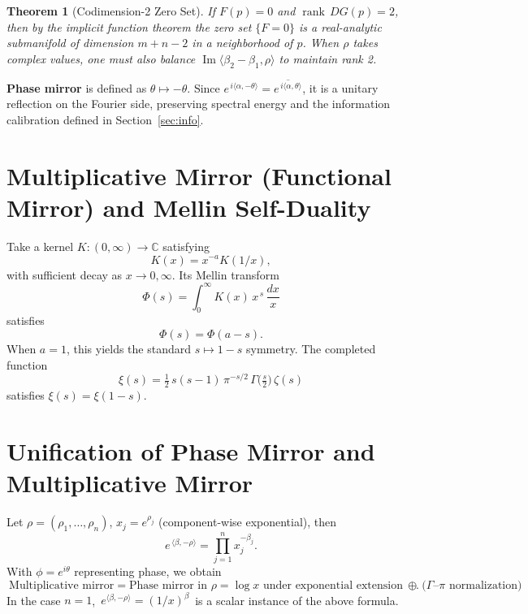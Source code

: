 \documentclass[11pt,a4paper]{article}
\newtheorem{theorem}{Theorem}[section]
\theoremstyle{remark}
\DeclareMathOperator{\Im}{Im}
\DeclareMathOperator{\rank}{rank}
\begin{document}
\begin{theorem}[Codimension-2 Zero Set]\label{thm:codim2}
If $F(p)=0$ and $\rank\,DG(p)=2$, then by the implicit function theorem the zero set $\{F=0\}$ is a real-analytic submanifold of dimension $m+n-2$ in a neighborhood of $p$. When $\rho$ takes complex values, one must also balance $\Im\langle\beta_2-\beta_1,\rho\rangle$ to maintain rank 2.
\end{theorem}

\textbf{Phase mirror} is defined as $\theta\mapsto-\theta$. Since $e^{\,i\langle\alpha,-\theta\rangle}=\overline{e^{\,i\langle\alpha,\theta\rangle}}$, it is a unitary reflection on the Fourier side, preserving spectral energy and the information calibration defined in Section~\ref{sec:info}.

\section{Multiplicative Mirror (Functional Mirror) and Mellin Self-Duality}

Take a kernel $K:(0,\infty)\to\mathbb{C}$ satisfying
\begin{equation}
K(x)=x^{-a}K(1/x),
\end{equation}
with sufficient decay as $x\to0,\infty$. Its Mellin transform
\begin{equation}
\Phi(s)=\int_0^\infty K(x)\,x^{\,s}\,\frac{dx}{x}
\end{equation}
satisfies
\begin{equation}
\Phi(s)=\Phi(a-s).
\end{equation}
When $a=1$, this yields the standard $s\mapsto1-s$ symmetry. The completed function
\begin{equation}
\xi(s)=\tfrac12\,s(s-1)\,\pi^{-s/2}\,\Gamma\bigl(\tfrac s2\bigr)\,\zeta(s)
\end{equation}
satisfies $\xi(s)=\xi(1-s)$.

\section{Unification of Phase Mirror and Multiplicative Mirror}

Let $\rho=(\rho_1,\dots,\rho_n)$, $x_j=e^{\rho_j}$ (component-wise exponential), then
\begin{equation}
e^{\,\langle\beta,-\rho\rangle}=\prod_{j=1}^{n}x_j^{-\beta_j}.
\end{equation}
With $\phi=e^{i\theta}$ representing phase, we obtain
\begin{equation}
\boxed{\ \text{Multiplicative mirror}=\text{Phase mirror in }\rho=\log x\text{ under exponential extension}\ \oplus\ \text{($\Gamma$--$\pi$ normalization)}\ }.
\end{equation}
In the case $n=1$, $\,e^{\langle\beta,-\rho\rangle}=(1/x)^{\beta}\,$ is a scalar instance of the above formula.
\end{document}
